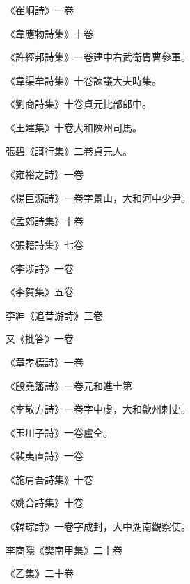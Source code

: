 \begin{pinyinscope}
 《崔峒詩》一卷



 《韋應物詩集》十卷



 《許經邦詩集》一卷建中右武衛胄曹參軍。



 《韋渠牟詩集》十卷諫議大夫時集。



 《劉商詩集》十卷貞元比部郎中。



 《王建集》十卷大和陜州司馬。



 張碧《謌行集》二卷貞元人。



 《雍裕之詩》一卷



 《楊巨源詩》一卷字景山，大和河中少尹。



 《孟郊詩集》十卷



 《張籍詩集》七卷



 《李涉詩》一卷



 《李賀集》五卷



 李紳《追昔游詩》三卷



 又《批答》一卷



 《章孝標詩》一卷



 《殷堯籓詩》一卷元和進士第



 《李敬方詩》一卷字中虔，大和歙州刺史。



 《玉川子詩》一卷盧仝。



 《裴夷直詩》一卷



 《施肩吾詩集》十卷



 《姚合詩集》十卷



 《韓琮詩》一卷字成封，大中湖南觀察使。



 李商隱《樊南甲集》二十卷



 《乙集》二十卷




\end{pinyinscope}
